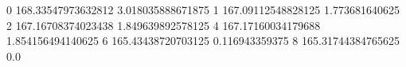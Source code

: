 0 168.33547973632812 3.018035888671875
1 167.09112548828125 1.773681640625
2 167.16708374023438 1.849639892578125
4 167.17160034179688 1.854156494140625
6 165.43438720703125 0.116943359375
8 165.31744384765625 0.0
